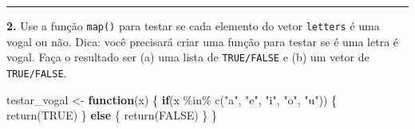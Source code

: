 \documentclass[
]{book}
\newenvironment{Shaded}{\begin{snugshade}}{\end{snugshade}}
\newcommand{\ConstantTok}[1]{\textcolor[rgb]{0.00,0.00,0.00}{#1}}
\newcommand{\ControlFlowTok}[1]{\textcolor[rgb]{0.13,0.29,0.53}{\textbf{#1}}}
\newcommand{\FunctionTok}[1]{\textcolor[rgb]{0.00,0.00,0.00}{#1}}
\newcommand{\NormalTok}[1]{#1}
\newcommand{\OtherTok}[1]{\textcolor[rgb]{0.56,0.35,0.01}{#1}}
\newcommand{\SpecialCharTok}[1]{\textcolor[rgb]{0.00,0.00,0.00}{#1}}
\newcommand{\StringTok}[1]{\textcolor[rgb]{0.31,0.60,0.02}{#1}}
\begin{document}
\begin{center}\rule{0.5\linewidth}{0.5pt}\end{center}

\textbf{2.} Use a função \texttt{map()} para testar se cada elemento do vetor \texttt{letters} é uma vogal ou não. Dica: você precisará criar uma função para testar se é uma letra é vogal. Faça o resultado ser (a) uma lista de \texttt{TRUE/FALSE} e (b) um vetor de \texttt{TRUE/FALSE}.

\begin{Shaded}
\begin{Highlighting}[]
\NormalTok{testar\_vogal }\OtherTok{\textless{}{-}} \ControlFlowTok{function}\NormalTok{(x) \{}
  \ControlFlowTok{if}\NormalTok{(x }\SpecialCharTok{\%in\%} \FunctionTok{c}\NormalTok{(}\StringTok{"a"}\NormalTok{, }\StringTok{"e"}\NormalTok{, }\StringTok{"i"}\NormalTok{, }\StringTok{"o"}\NormalTok{, }\StringTok{"u"}\NormalTok{)) \{}
    \FunctionTok{return}\NormalTok{(}\ConstantTok{TRUE}\NormalTok{)}
\NormalTok{  \} }\ControlFlowTok{else}\NormalTok{ \{}
    \FunctionTok{return}\NormalTok{(}\ConstantTok{FALSE}\NormalTok{)}
\NormalTok{  \}}
\NormalTok{\}}


\end{Highlighting}
\end{Shaded}
\end{document}

